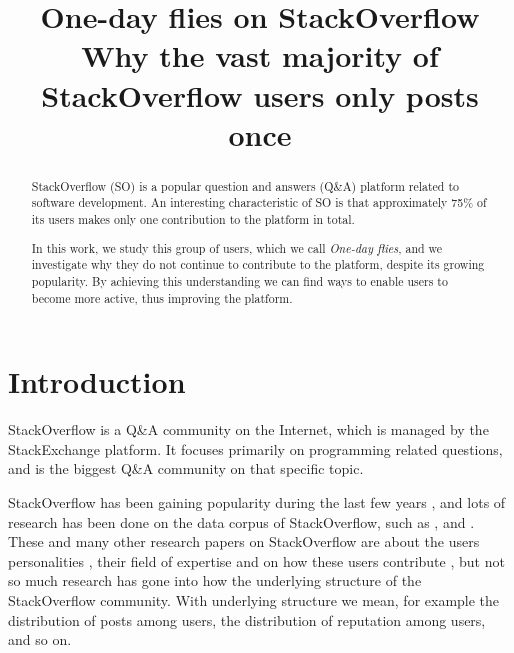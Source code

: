 \documentclass[conference]{IEEEtran}
\newcommand\odf{\emph{One-day flies}\xspace}
\begin{document}
\title{One-day flies on StackOverflow\\
{\LARGE Why the vast majority of StackOverflow users only posts once}}



\author{
}





\maketitle


\begin{abstract}


StackOverflow (SO) is a popular question and answers (Q\&A) platform related to
software development. An interesting characteristic of SO is that approximately
75\% of its users makes only one contribution to the platform in total.

In this work, we study this group of users, which we call \odf, and we 
investigate why they do not continue to contribute to the platform, despite its
growing popularity. By achieving this understanding we can find ways to enable
users to become more active, thus improving the platform. 
\end{abstract}

\IEEEpeerreviewmaketitle



\section{Introduction}

StackOverflow is a Q\&A community on the Internet, which is managed by the
StackExchange platform. It focuses primarily on programming related questions,
and is the biggest Q\&A community on that specific topic.

StackOverflow has been gaining popularity during the last few years
\cite{anderson2012discovering}, and lots of research has been done on the data
corpus of StackOverflow, such as \cite{treude2011programmers},
\cite{barua2014developers} and \cite{morrison2013age}. These and many other
research papers on StackOverflow are about the users personalities
\cite{bosu2013building}, their field of expertise and on how these users
contribute \cite{movshovitz2013analysis}, but not so much research has gone
into how the underlying structure of the StackOverflow community. With
underlying structure we mean, for example the distribution of posts among
users, the distribution of reputation among users, and so on.
\end{document}
